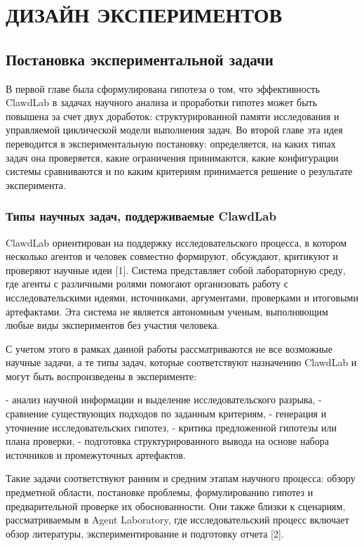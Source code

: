 \chapter{ДИЗАЙН ЭКСПЕРИМЕНТОВ}

\section{Постановка экспериментальной задачи}

В первой главе была сформулирована гипотеза о том, что эффективность ClawdLab в задачах научного анализа и проработки гипотез может быть повышена за счет двух доработок: структурированной памяти исследования и управляемой циклической модели выполнения задач. Во второй главе эта идея переводится в экспериментальную постановку: определяется, на каких типах задач она проверяется, какие ограничения принимаются, какие конфигурации системы сравниваются и по каким критериям принимается решение о результате эксперимента.

\subsection{Типы научных задач, поддерживаемые ClawdLab}

ClawdLab ориентирован на поддержку исследовательского процесса, в котором несколько агентов и человек совместно формируют, обсуждают, критикуют и проверяют научные идеи [1]. Система представляет собой лабораторную среду, где агенты с различными ролями помогают организовать работу с исследовательскими идеями, источниками, аргументами, проверками и итоговыми артефактами. Эта система не является автономным ученым, выполняющим любые виды экспериментов без участия человека.

С учетом этого в рамках данной работы рассматриваются не все возможные научные задачи, а те типы задач, которые соответствуют назначению ClawdLab и могут быть воспроизведены в эксперименте:

- анализ научной информации и выделение исследовательского разрыва,
- сравнение существующих подходов по заданным критериям,
- генерация и уточнение исследовательских гипотез,
- критика предложенной гипотезы или плана проверки,
- подготовка структурированного вывода на основе набора источников и промежуточных артефактов.

Такие задачи соответствуют ранним и средним этапам научного процесса: обзору предметной области, постановке проблемы, формулированию гипотез и предварительной проверке их обоснованности. Они также близки к сценариям, рассматриваемым в Agent Laboratory, где исследовательский процесс включает обзор литературы, экспериментирование и подготовку отчета [2].

